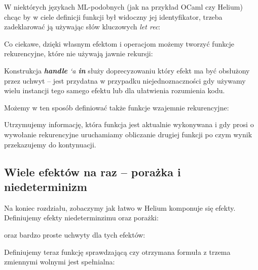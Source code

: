 W niektórych językach ML-podobnych (jak na przykład OCaml czy Helium) chcąc by w ciele definicji funkcji był widoczny jej identyfikator, trzeba zadeklarować ją używając słów kluczowych \textit{let rec}:



Co ciekawe, dzięki własnym efektom i operacjom możemy tworzyć funkcje rekurencyjne, które nie używają jawnie rekursji:



Konstrukcja \textit{\textbf{handle} `a \textbf{in}} służy doprecyzowaniu który efekt ma być obsłużony przez uchwyt -- jest przydatna w przypadku niejednoznaczności gdy używamy wielu instancji tego samego efektu lub dla ułatwienia rozumienia kodu.

Możemy w ten sposób definiować także funkcje wzajemnie rekurencyjne:



Utrzymujemy informację, która funkcja jest aktualnie wykonywana i gdy prosi o wywołanie rekurencyjne uruchamiamy obliczanie drugiej funkcji po czym wynik przekazujemy do kontynuacji.

% 
% 

\subsection{Wiele efektów na raz -- porażka i niedeterminizm}

Na koniec rozdziału, zobaczymy jak łatwo w Helium komponuje się efekty. Definiujemy efekty niedeterminzimu oraz porażki:



oraz bardzo proste uchwyty dla tych efektów:



Definiujemy teraz funkcję sprawdzającą czy otrzymana formuła z trzema zmiennymi wolnymi jest spełnialna:




